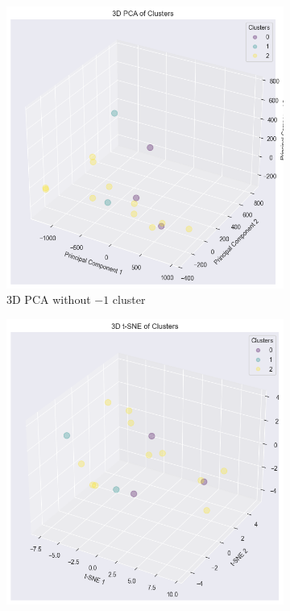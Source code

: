 \begin{figure}[H]
    \hspace*{\fill}
    \centering
    \begin{subfigure}[b]{0.45\textwidth}
        \centering
        \includegraphics[width=1.0\textwidth]{src/figs/3d_PCA_DBSCAN_without.png} 
        \caption{3D PCA without $-1$ cluster}\label{fig:DBSCAN_PCA_without}
    \end{subfigure}
    \hfill
    \begin{subfigure}[b]{0.45\textwidth}
        \centering
        \includegraphics[width=1.0\textwidth]{src/figs/3d_t-SNE_DBSCAN_without.png} 

\end{subfigure}
\end{figure}

